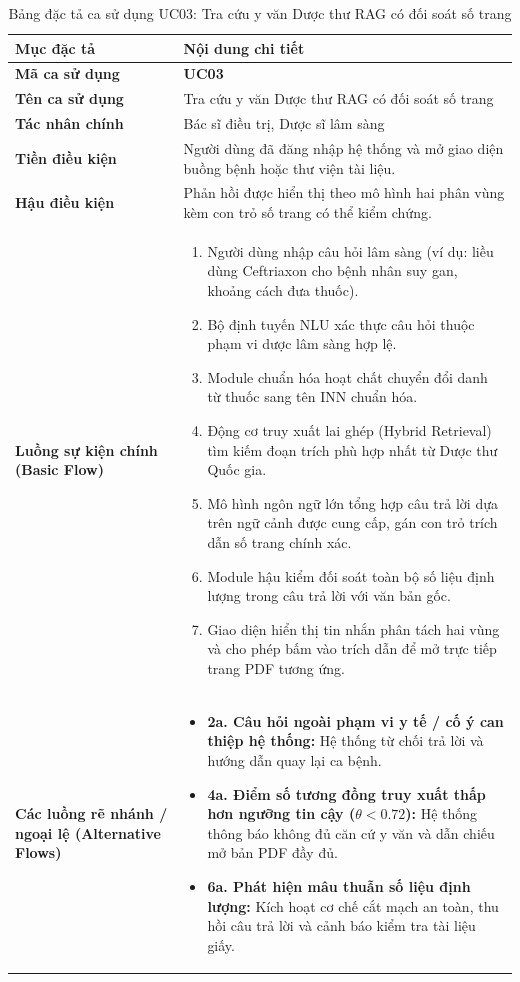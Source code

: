 \begin{table}[htbp]
\centering
\small
\begin{tabularx}{\textwidth}{L{3.2cm} Y}
\toprule
\textbf{Mục đặc tả} & \textbf{Nội dung chi tiết} \\
\midrule
\textbf{Mã ca sử dụng} & \textbf{UC03} \\
\textbf{Tên ca sử dụng} & Tra cứu y văn Dược thư RAG có đối soát số trang \\
\textbf{Tác nhân chính} & Bác sĩ điều trị, Dược sĩ lâm sàng \\
\textbf{Tiền điều kiện} & Người dùng đã đăng nhập hệ thống và mở giao diện buồng bệnh hoặc thư viện tài liệu. \\
\textbf{Hậu điều kiện} & Phản hồi được hiển thị theo mô hình hai phân vùng kèm con trỏ số trang có thể kiểm chứng. \\
\midrule
\textbf{Luồng sự kiện chính (Basic Flow)} & 
\begin{enumerate}[leftmargin=1.2em, topsep=0pt, partopsep=0pt]
    \item Người dùng nhập câu hỏi lâm sàng (ví dụ: liều dùng Ceftriaxon cho bệnh nhân suy gan, khoảng cách đưa thuốc).
    \item Bộ định tuyến NLU xác thực câu hỏi thuộc phạm vi dược lâm sàng hợp lệ.
    \item Module chuẩn hóa hoạt chất chuyển đổi danh từ thuốc sang tên INN chuẩn hóa.
    \item Động cơ truy xuất lai ghép (Hybrid Retrieval) tìm kiếm đoạn trích phù hợp nhất từ Dược thư Quốc gia.
    \item Mô hình ngôn ngữ lớn tổng hợp câu trả lời dựa trên ngữ cảnh được cung cấp, gán con trỏ trích dẫn số trang chính xác.
    \item Module hậu kiểm đối soát toàn bộ số liệu định lượng trong câu trả lời với văn bản gốc.
    \item Giao diện hiển thị tin nhắn phân tách hai vùng và cho phép bấm vào trích dẫn để mở trực tiếp trang PDF tương ứng.
\end{enumerate} \\
\midrule
\textbf{Các luồng rẽ nhánh / ngoại lệ (Alternative Flows)} & 
\begin{itemize}[leftmargin=1.2em, topsep=0pt, partopsep=0pt]
    \item \textbf{2a. Câu hỏi ngoài phạm vi y tế / cố ý can thiệp hệ thống:} Hệ thống từ chối trả lời và hướng dẫn quay lại ca bệnh.
    \item \textbf{4a. Điểm số tương đồng truy xuất thấp hơn ngưỡng tin cậy ($\theta < 0.72$):} Hệ thống thông báo không đủ căn cứ y văn và dẫn chiếu mở bản PDF đầy đủ.
    \item \textbf{6a. Phát hiện mâu thuẫn số liệu định lượng:} Kích hoạt cơ chế cắt mạch an toàn, thu hồi câu trả lời và cảnh báo kiểm tra tài liệu giấy.
\end{itemize} \\
\bottomrule
\end{tabularx}
\caption{Bảng đặc tả ca sử dụng UC03: Tra cứu y văn Dược thư RAG có đối soát số trang}
\label{tab:uc03_spec}
\end{table}

